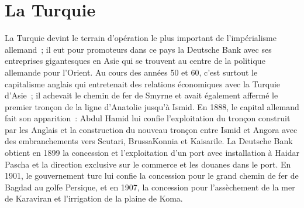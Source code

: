\documentclass[french,twoside]{book} %
\begin{document}
\section[{La Turquie}]{La Turquie}\renewcommand{\leftmark}{La Turquie}

\noindent La Turquie devint le terrain d’opération le plus important de l’impérialisme allemand ; il eut pour promoteurs dans ce pays la Deutsche Bank avec ses entreprises gigantesques en Asie qui se trouvent au centre de la politique allemande pour l’Orient. Au cours des années 50 et 60, c’est surtout le capitalisme anglais qui entretenait des relations économiques avec la Turquie d’Asie ; il achevait le chemin de fer de Smyrne et avait également affermé le premier tronçon de la ligne d’Anatolie jusqu’à Ismid. En 1888, le capital allemand fait son apparition : Abdul Hamid lui confie l’exploitation du tronçon construit par les Anglais et la construction du nouveau tronçon entre Ismid et Angora avec des embranchements vers Scutari, BrussaKonnia et Kaisarile. La Deutsche Bank obtient en 1899 la concession et l’exploitation d’un port avec installation à Haidar Pascha et la direction exclusive sur le commerce et les douanes dans le port. En 1901, le gouvernement turc lui confie la concession pour le grand chemin de fer de Bagdad au golfe Persique, et en 1907, la concession pour l’assèchement de la mer de Karaviran et l’irrigation de la plaine de Koma.\par
\end{document}

